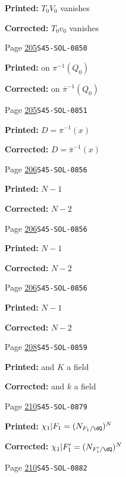 \documentclass[oneside]{book}
\theoremstyle{sga-source}
\theoremstyle{sga-source-dash}
\theoremstyle{sga-source-dotdash}
\theoremstyle{sga-source-number-note-dash}
\theoremstyle{sga-source-note-number-dotdash}
\theoremstyle{sga-source-example-dotdash}
\theoremstyle{sga-source-inline-number}
\theoremstyle{sga-source-bare-number}
\theoremstyle{sga-source}
\begin{document}
\begin{description}
\par\noindent\textbf{Printed:} $T_0 V_0$ vanishes
\par\noindent\textbf{Corrected:} $T_0 v_0$ vanishes
\smallskip
\item[\hypertarget{apparatus:EN-0146}{146}] Page \hyperlink{printpage:en:205}{205}\quad\texttt{S45-SOL-0850}
\par\noindent\textbf{Printed:} on $\pi^{-1}(Q_0)$
\par\noindent\textbf{Corrected:} on $\bar\pi^{-1}(Q_0)$
\smallskip
\item[\hypertarget{apparatus:EN-0147}{147}] Page \hyperlink{printpage:en:205}{205}\quad\texttt{S45-SOL-0851}
\par\noindent\textbf{Printed:} $D=\pi^{-1}(x)$
\par\noindent\textbf{Corrected:} $D=\bar\pi^{-1}(x)$
\smallskip
\item[\hypertarget{apparatus:EN-0148}{148}] Page \hyperlink{printpage:en:206}{206}\quad\texttt{S45-SOL-0856}
\par\noindent\textbf{Printed:} \(N-1\)
\par\noindent\textbf{Corrected:} \(N-2\)
\smallskip
\item[\hypertarget{apparatus:EN-0149}{149}] Page \hyperlink{printpage:en:206}{206}\quad\texttt{S45-SOL-0856}
\par\noindent\textbf{Printed:} \(N-1\)
\par\noindent\textbf{Corrected:} \(N-2\)
\smallskip
\item[\hypertarget{apparatus:EN-0150}{150}] Page \hyperlink{printpage:en:206}{206}\quad\texttt{S45-SOL-0856}
\par\noindent\textbf{Printed:} \(N-1\)
\par\noindent\textbf{Corrected:} \(N-2\)
\smallskip
\item[\hypertarget{apparatus:EN-0151}{151}] Page \hyperlink{printpage:en:208}{208}\quad\texttt{S45-SOL-0859}
\par\noindent\textbf{Printed:} and $K$ a field
\par\noindent\textbf{Corrected:} and $k$ a field
\smallskip
\item[\hypertarget{apparatus:EN-0152}{152}] Page \hyperlink{printpage:en:210}{210}\quad\texttt{S45-SOL-0879}
\par\noindent\textbf{Printed:} \(\chi_1|F_1=(N_{F_1/\dQ})^N\)
\par\noindent\textbf{Corrected:} \(\chi_1|F_1'=(N_{F_1'/\dQ})^N\)
\smallskip
\item[\hypertarget{apparatus:EN-0153}{153}] Page \hyperlink{printpage:en:210}{210}\quad\texttt{S45-SOL-0882}

\end{description}
\end{document}
